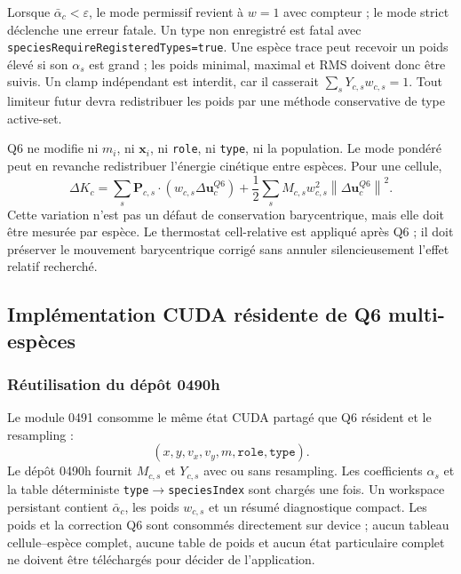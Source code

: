 \documentclass[11pt,a4paper]{article}
\begin{document}
Lorsque $\bar\alpha_c<\varepsilon$, le mode permissif revient à $w=1$ avec compteur ; le mode strict déclenche une erreur fatale. Un type non enregistré est fatal avec \texttt{speciesRequireRegisteredTypes=true}. Une espèce trace peut recevoir un poids élevé si son $\alpha_s$ est grand ; les poids minimal, maximal et RMS doivent donc être suivis. Un clamp indépendant est interdit, car il casserait $\sum_sY_{c,s}w_{c,s}=1$. Tout limiteur futur devra redistribuer les poids par une méthode conservative de type active-set.

Q6 ne modifie ni $m_i$, ni $\bm{x}_i$, ni \texttt{role}, ni \texttt{type}, ni la population. Le mode pondéré peut en revanche redistribuer l'énergie cinétique entre espèces. Pour une cellule,
\begin{equation}
  \Delta K_c
  =\sum_s\bm{P}_{c,s}\cdot
     \left(w_{c,s}\Delta\bm{u}^{Q6}_c\right)
  +\frac{1}{2}\sum_sM_{c,s}w_{c,s}^2
     \left\|\Delta\bm{u}^{Q6}_c\right\|^2.
\end{equation}
Cette variation n'est pas un défaut de conservation barycentrique, mais elle doit être mesurée par espèce. Le thermostat cell-relative est appliqué après Q6 ; il doit préserver le mouvement barycentrique corrigé sans annuler silencieusement l'effet relatif recherché.

\subsection{Implémentation CUDA résidente de Q6 multi-espèces}

\subsubsection{Réutilisation du dépôt 0490h}

Le module 0491 consomme le même état CUDA partagé que Q6 résident et le resampling :
\begin{equation}
  (x,y,v_x,v_y,m,\texttt{role},\texttt{type}).
\end{equation}
Le dépôt 0490h fournit $M_{c,s}$ et $Y_{c,s}$ avec ou sans resampling. Les coefficients $\alpha_s$ et la table déterministe \texttt{type}$\rightarrow$\texttt{speciesIndex} sont chargés une fois. Un workspace persistant contient $\bar\alpha_c$, les poids $w_{c,s}$ et un résumé diagnostique compact. Les poids et la correction Q6 sont consommés directement sur device ; aucun tableau cellule--espèce complet, aucune table de poids et aucun état particulaire complet ne doivent être téléchargés pour décider de l'application.
\end{document}
